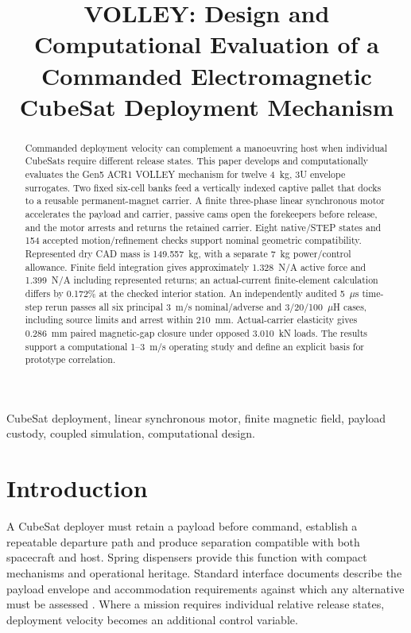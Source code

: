 \documentclass[conference,a4paper]{IEEEtran}
\begin{document}
\title{VOLLEY: Design and Computational Evaluation of a Commanded Electromagnetic CubeSat Deployment Mechanism}
\author{
}
\maketitle
\begin{abstract}
Commanded deployment velocity can complement a manoeuvring host when individual CubeSats require different release states. This paper develops and computationally evaluates the Gen5 ACR1 VOLLEY mechanism for twelve 4~kg, 3U envelope surrogates. Two fixed six-cell banks feed a vertically indexed captive pallet that docks to a reusable permanent-magnet carrier. A finite three-phase linear synchronous motor accelerates the payload and carrier, passive cams open the forekeepers before release, and the motor arrests and returns the retained carrier. Eight native/STEP states and 154 accepted motion/refinement checks support nominal geometric compatibility. Represented dry CAD mass is 149.557~kg, with a separate 7~kg power/control allowance. Finite field integration gives approximately 1.328~N/A active force and 1.399~N/A including represented returns; an actual-current finite-element calculation differs by 0.172\% at the checked interior station. An independently audited 5~$\mu$s time-step rerun passes all six principal 3~m/s nominal/adverse and 3/20/100~$\mu$H cases, including source limits and arrest within 210~mm. Actual-carrier elasticity gives 0.286~mm paired magnetic-gap closure under opposed 3.010~kN loads. The results support a computational 1--3~m/s operating study and define an explicit basis for prototype correlation.
\end{abstract}
\begin{IEEEkeywords}
CubeSat deployment, linear synchronous motor, finite magnetic field, payload custody, coupled simulation, computational design.
\end{IEEEkeywords}

\section{Introduction}
A CubeSat deployer must retain a payload before command, establish a repeatable departure path and produce separation compatible with both spacecraft and host. Spring dispensers provide this function with compact mechanisms and operational heritage. Standard interface documents describe the payload envelope and accommodation requirements against which any alternative must be assessed \cite{jssod,cds}. Where a mission requires individual relative release states, deployment velocity becomes an additional control variable.
\end{document}
